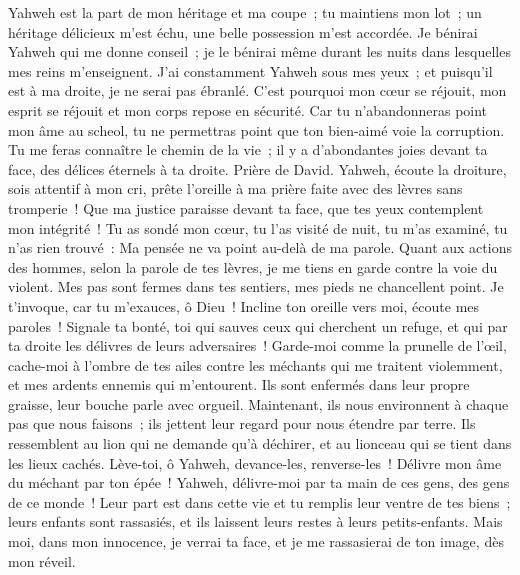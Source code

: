 \begin{multicols}{2}
Yahweh est la part de mon héritage et ma coupe~; tu maintiens mon lot~;
un héritage délicieux m'est échu, une belle possession m'est accordée.
Je bénirai Yahweh qui me donne conseil~; je le bénirai même durant les nuits dans lesquelles mes reins m'enseignent.
J'ai constamment Yahweh sous mes yeux~; et puisqu'il est à ma droite, je ne serai pas ébranlé.
C'est pourquoi mon cœur se réjouit, mon esprit se réjouit et mon corps repose en sécurité.
Car tu n'abandonneras point mon âme au scheol, tu ne permettras point que ton bien-aimé voie la corruption.
Tu me feras connaître le chemin de la vie~; il y a d'abondantes joies devant ta face, des délices éternels à ta droite.
\VerseOne{}Prière de David. Yahweh, écoute la droiture, sois attentif à mon cri, prête l'oreille à ma prière faite avec des lèvres sans tromperie~!
Que ma justice paraisse devant ta face, que tes yeux contemplent mon intégrité~!
Tu as sondé mon cœur, tu l'as visité de nuit, tu m'as examiné, tu n'as rien trouvé~: Ma pensée ne va point au-delà de ma parole.
Quant aux actions des hommes, selon la parole de tes lèvres, je me tiens en garde contre la voie du violent.
Mes pas sont fermes dans tes sentiers, mes pieds ne chancellent point.
Je t'invoque, car tu m'exauces, ô Dieu~! Incline ton oreille vers moi, écoute mes paroles~!
Signale ta bonté, toi qui sauves ceux qui cherchent un refuge, et qui par ta droite les délivres de leurs adversaires~!
Garde-moi comme la prunelle de l'œil, cache-moi à l'ombre de tes ailes
contre les méchants qui me traitent violemment, et mes ardents ennemis qui m'entourent.
Ils sont enfermés dans leur propre graisse, leur bouche parle avec orgueil.
Maintenant, ils nous environnent à chaque pas que nous faisons~; ils jettent leur regard pour nous étendre par terre.
Ils ressemblent au lion qui ne demande qu'à déchirer, et au lionceau qui se tient dans les lieux cachés.
Lève-toi, ô Yahweh, devance-les, renverse-les~! Délivre mon âme du méchant par ton épée~!
Yahweh, délivre-moi par ta main de ces gens, des gens de ce monde~! Leur part est dans cette vie et tu remplis leur ventre de tes biens~; leurs enfants sont rassasiés, et ils laissent leurs restes à leurs petits-enfants.
Mais moi, dans mon innocence, je verrai ta face, et je me rassasierai de ton image, dès mon réveil.

\end{multicols}
